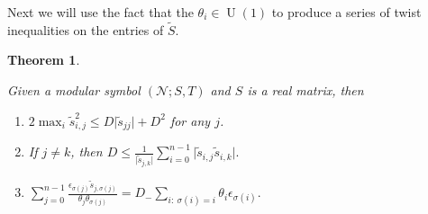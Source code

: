 \documentclass[12pt,psamsfonts]{amsart}
\newcommand{\e}{{\epsilon}}
\newcommand{\mN}{\mathcal{N}}
\DeclareMathOperator{\U}{U}
\numberwithin{equation}{section}
\newtheorem{theorem}{Theorem}[section]
\theoremstyle{definition}
\begin{document}
Next we will use the fact that the $\theta_i \in \U(1)$ to produce
a series of twist inequalities on the entries of $\tilde S$.

\begin{theorem}\label{twistinequlity}

Given a modular symbol $(\mN;S,T)$ and $S$ is a real matrix, then

\begin{enumerate}

\item $2 \max_i \tilde s_{i,j}^2 \le D\vert \tilde{s}_{jj}\vert +
D^2$ for any $j$. \label{jjtwistinequality}

\item If $j\neq k$, then $D \le \frac{1}{\vert \tilde
s_{j,k}\vert} \sum_{i=0}^{n-1} \vert \tilde s_{i,j}\tilde
s_{i,k}\vert.$\label{jktwistinequality}

\item $\sum_{j=0}^{n-1} \frac{\e_{\sigma(j)} \tilde
s_{j,\sigma(j)}}{\theta_j \theta_{\sigma(j)}} = D_-
\sum_{i:~\sigma(i)=i} \theta_i \e_{\sigma(i)}.$


\end{enumerate}

\end{theorem}
\end{document}
